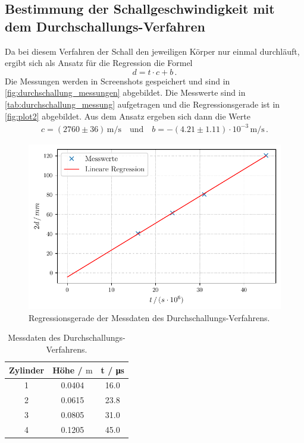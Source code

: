 \subsection{Bestimmung der Schallgeschwindigkeit mit dem Durchschallungs-Verfahren}

Da bei diesem Verfahren der Schall den jeweiligen Körper nur einmal durchläuft, ergibt sich als Ansatz für die Regression die Formel
\begin{equation*}
  d = t \cdot c + b \, .
\end{equation*}
Die Messungen werden in Screenshots gespeichert und sind in \autoref{fig:durchschallung_messungen} abgebildet.
Die Messwerte sind in \autoref{tab:durchschallung_messung} aufgetragen und die Regressionsgerade ist in \autoref{fig:plot2} abgebildet.
Aus dem Ansatz ergeben sich dann die Werte
\begin{align*}
  c = (2760 \pm 36)  \, \unit{\meter / \second} \quad \text{und} \quad b = -(4.21 \pm 1.11) \cdot 10^{-3} \, \unit{\meter / \second} \, .
\end{align*}

\begin{figure}
  \centering
  \includegraphics[width = 0.7\linewidth]{build/plot2.pdf}
  \caption{Regressionsgerade der Messdaten des Durchschallungs-Verfahrens.}
  \label{fig:plot2}
\end{figure}

\begin{table}
  \centering
  \caption{Messdaten des Durchschallungs-Verfahrens.}
  \label{tab:durchschallung_messung}
  \begin{tabular}{c | c c}
      \toprule
      Zylinder& Höhe / $\unit\meter$ & t / \unit{\micro\second}\\ 
      \midrule
      1     & 0.0404 & 16.0 \\
      2     & 0.0615 & 23.8 \\
      3     & 0.0805 & 31.0 \\
      4     & 0.1205 & 45.0 \\
      \bottomrule
  \end{tabular}
\end{table}


